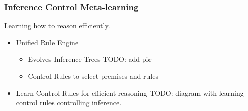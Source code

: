 \documentclass{beamer}
\begin{document}
\begin{frame}
  \frametitle{Inference Control Meta-learning}









  Learning how to \alert {reason efficiently}.

  \begin{itemize}
  \item<+-> Unified Rule Engine
    \begin{itemize}
    \item Evolves Inference Trees
      TODO: add pic
    \item \alert{Control Rules} to select premises and rules
    \end{itemize}
  \item<+-> Learn Control Rules for efficient reasoning
    TODO: diagram with learning control rules controlling inference.
  \end{itemize}
\end{frame}
\end{document}
